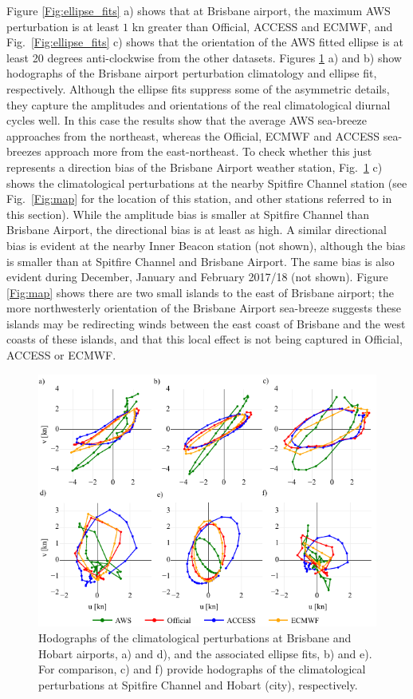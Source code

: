 \documentclass[twocol]{ametsoc}
\begin{document}
Figure \ref{Fig:ellipse_fits} a) shows that at Brisbane airport, the maximum AWS perturbation is at least $1$ kn greater than Official, ACCESS and ECMWF, and Fig.~\ref{Fig:ellipse_fits} c) shows that the orientation of the AWS fitted ellipse is at least 20 degrees anti-clockwise from the other datasets. Figures \ref{Fig:ellipse_hodo} a) and b) show hodographs of the Brisbane airport perturbation climatology and ellipse fit, respectively. Although the ellipse fits suppress some of the asymmetric details, they capture the amplitudes and orientations of the real climatological diurnal cycles well. In this case the results show that the average AWS sea-breeze approaches from the northeast, whereas the Official, ECMWF and ACCESS sea-breezes approach more from the east-northeast. To check whether this just represents a direction bias of the Brisbane Airport weather station, Fig.~\ref{Fig:ellipse_hodo} c) shows the climatological perturbations at the nearby Spitfire Channel station (see Fig.~\ref{Fig:map} for the location of this station, and other stations referred to in this section). While the amplitude bias is smaller at Spitfire Channel than Brisbane Airport, the directional bias is at least as high. A similar directional bias is evident at the nearby Inner Beacon station (not shown), although the bias is smaller than at Spitfire Channel and Brisbane Airport. The same bias is also evident during December, January and February 2017/18 (not shown). Figure \ref{Fig:map} shows there are two small islands to the east of Brisbane airport; the more northwesterly orientation of the Brisbane Airport sea-breeze suggests these islands may be redirecting winds between the east coast of Brisbane and the west coasts of these islands, and that this local effect is not being captured in Official, ACCESS or ECMWF. 
\begin{figure}
\centering
\includegraphics[width=39pc]{ellipse_hodo.pdf}
\caption{Hodographs of the climatological perturbations at Brisbane and Hobart airports, a) and d), and the associated ellipse fits, b) and e). For comparison, c) and f) provide hodographs of the climatological perturbations at Spitfire Channel and Hobart (city), respectively.}
\label{Fig:ellipse_hodo}
\end{figure}
\end{document}
